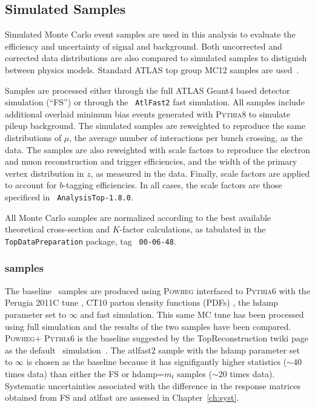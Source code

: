\subsection{Simulated Samples}

Simulated Monte Carlo event samples are used in this analysis to evaluate the efficiency and uncertainty of signal and background.  Both uncorrected and corrected data distributions are also compared to simulated samples to distiguish between physics models. 
Standard ATLAS top group MC12 samples are used~\cite{topmc}.%

Samples are processed either through the full ATLAS Geant4\cite{bib:g4} based detector simulation (``FS'') or through the \texttt{ AtlFast2}\cite{atlfast2} fast simulation. All samples include additional overlaid minimum bias events generated with \textsc{  Pythia8} \cite{pythia8} to simulate pileup background. 
The simulated samples are reweighted to reproduce the same distributions of $\mu$, the average number of interactions per bunch crossing, as the data. The samples are also reweighted with scale factors to reproduce the electron and muon reconstruction and trigger efficiencies, and the width of the primary vertex distribution in $z$, as measured in the data. Finally, scale factors are applied to account for $b$-tagging efficiencies.  In all cases,
the scale factors are those specificed in \texttt{ AnalysisTop-1.8.0}.

All Monte Carlo samples are normalized according to the best available theoretical cross-section and $K$-factor calculations, as tabulated in the \texttt{ TopDataPreparation} package, tag \texttt{ 00-06-48}.

\subsubsection{\ttbar samples}\label{ss:mcsignal}

The baseline \ttbar\ samples are produced using \textsc{  Powheg} \cite{Powheg, Powheg2, Powheg3, Powheg4} interfaced to \textsc{  Pythia6} \cite{pythia6} with the Perugia 2011C tune \cite{perugia}, CT10 parton density functions (PDFs) \cite{cttenpdf}, the hdamp parameter set to $\infty$ and fast simulation.  
This same MC tune has been processed using full simulation and the results of the two samples have been compared.
\textsc{  Powheg}+\textsc{  Pythia6} is the baseline suggested by the TopReconstruction twiki page as the default \ttbar\ simulation~\cite{topmc}. The atlfast2 sample with the hdamp parameter set to $\infty$ is chosen as the baseline because it has signifigantly higher statistics ($\sim 40$ times data) than either the FS or hdamp=$m_t$ samples ($\sim 20$ times data).
Systematic uncertainties associated with the difference in the response matrices obtained from FS and atlfast are
assessed in Chapter~\ref{ch:syst}.



